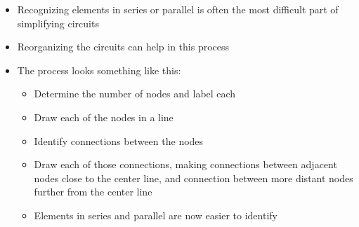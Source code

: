 \begin{itemize}
\item Recognizing elements in series or parallel is often the most difficult part of simplifying circuits
\item Reorganizing the circuits can help in this process
\item The process looks something like this:
  \begin{itemize}
  \item Determine the number of nodes and label each
  \item Draw each of the nodes in a line
  \item Identify connections between the nodes
  \item Draw each of those connections, making connections between adjacent nodes close to the center line, and connection between more distant nodes further from the center line
  \item Elements in series and parallel are now easier to identify
  \end{itemize}
\end{itemize}
